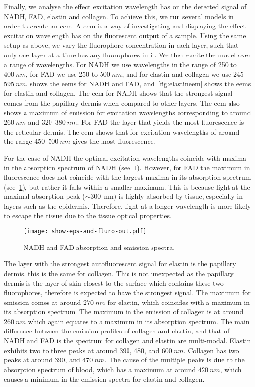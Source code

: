 Finally, we analyse the effect excitation wavelength has on the detected signal of NADH, FAD, elastin and collagen.
To achieve this, we run several models in order to create an \gls*{eem}.
A \gls*{eem} is a way of investigating and displaying the effect excitation wavelength has on the fluorescent output of a sample.
Using the same setup as above, we vary the fluorophore concentration in each layer, such that only one layer at a time has any fluorophores in it.
We then excite the model over a range of wavelengths.
For NADH we use wavelengths in the range of 250 to $400~nm$, for FAD we use 250 to $500~nm$, and for elastin and collagen we use $245$--$595~nm$.
 shows the \gls*{eem}s for NADH and FAD, and~\cref{fig:elastineem} shows the \gls*{eem}s for elastin and collagen.
The \gls*{eem} for NADH shows that the strongest signal comes from the papillary dermis when compared to other layers.
The \gls*{eem} also shows a maximum of emission for excitation wavelengths corresponding to around $260~nm$ and $320$--$380~nm$.
For FAD the layer that yields the most fluorescence is the reticular dermis.
The \gls*{eem} shows that for excitation wavelengths of around the range $450$--$500~nm$ gives the most fluorescence.

For the case of NADH the optimal excitation wavelengths coincide with maxima in the absorption spectrum of NADH (see~\cref{fig:epsfluro}).
However, for FAD the maximum in fluorescence does not coincide with the largest maxima in its absorption spectrum (see~\cref{fig:epsfluro}), but rather it falls within a smaller maximum.
This is because light at the maximal absorption peak ($\sim$300~nm) is highly absorbed by tissue, especially in layers such as the epidermis.
Therefore, light at a longer wavelength is more likely to escape the tissue due to the tissue optical properties.

\begin{figure}[!htpb]
    \centering
    \texttt{[image: show-eps-and-fluro-out.pdf]}
    \caption{NADH and FAD absorption and emission spectra.}
    \label{fig:epsfluro}
\end{figure}


The layer with the strongest autofluorescent signal for elastin is the papillary dermis, this is the same for collagen.
This is not unexpected as the papillary dermis is the layer of skin closest to the surface which contains these two fluorophores, therefore is expected to have the strongest signal.
The maximum for emission comes at around $270~nm$ for elastin, which coincides with a maximum in its absorption spectrum.
The maximum in the emission of collagen is at around $260~nm$ which again equates to a maximum in its absorption spectrum.
The main difference between the emission profiles of collagen and elastin, and that of NADH and FAD is the spectrum for collagen and elastin are multi-modal.
Elastin exhibits two to three peaks at around 390, 480, and $600~nm$.
Collagen has two peaks at around 390, and $470~nm$.
The cause of the multiple peaks is due to the absorption spectrum of blood, which has a maximum at around $420~nm$, which causes a minimum in the emission spectra for elastin and collagen.

